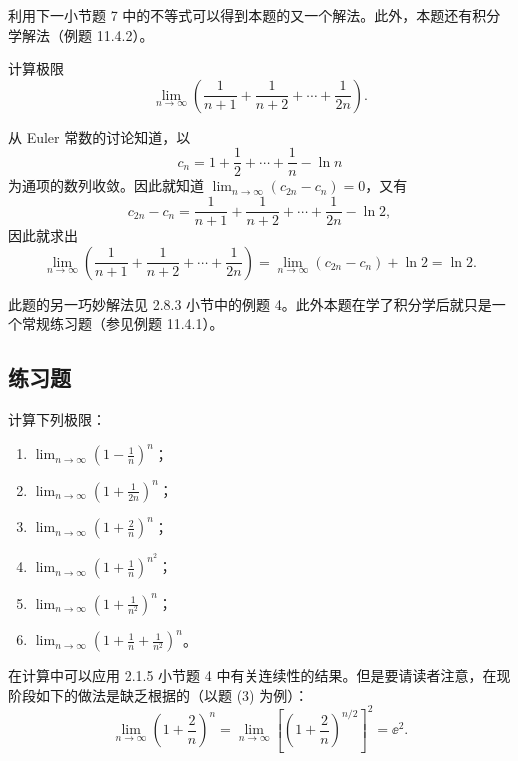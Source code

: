 \begin{xremark}
利用下一小节题 7 中的不等式可以得到本题的又一个解法。此外，本题还有积分学解法（例题 11.4.2）。
\end{xremark}

\begin{xexample}[2.5.4]
计算极限
\[
  \lim_{n\to\infty}\left(\frac1{n+1}+\frac1{n+2}+\cdots+\frac1{2n}\right).
\]
\end{xexample}
\begin{xsolution}
从 Euler 常数的讨论知道，以
\[
  c_n=1+\frac12+\cdots+\frac1n-\ln n
\]
为通项的数列收敛。因此就知道 $\displaystyle\lim_{n\to\infty}(c_{2n}-c_n)=0$，又有
\[
  c_{2n}-c_n=\frac1{n+1}+\frac1{n+2}+\cdots+\frac1{2n}-\ln2,
\]
因此就求出
\[
  \lim_{n\to\infty}\left(\frac1{n+1}+\frac1{n+2}+\cdots+\frac1{2n}\right)
  =\lim_{n\to\infty}(c_{2n}-c_n)+\ln2=\ln2.
\]
\end{xsolution}

\begin{xremark}
此题的另一巧妙解法见 2.8.3 小节中的例题 4。此外本题在学了积分学后就只是一个常规练习题（参见例题 11.4.1）。
\end{xremark}

\subsection{练习题}

\begin{xexercise}[1]
计算下列极限：
  \begin{enumerate}[label=(\arabic*)]
    \item $\displaystyle\lim_{n\to\infty}\left(1-\frac1n\right)^n$；
    \item $\displaystyle\lim_{n\to\infty}\left(1+\frac1{2n}\right)^n$；
    \item $\displaystyle\lim_{n\to\infty}\left(1+\frac2n\right)^n$；
    \item $\displaystyle\lim_{n\to\infty}\left(1+\frac1n\right)^{n^2}$；
    \item $\displaystyle\lim_{n\to\infty}\left(1+\frac1{n^2}\right)^n$；
    \item $\displaystyle\lim_{n\to\infty}\left(1+\frac1n+\frac1{n^2}\right)^n$。
  \end{enumerate}

  \begin{xremark}
  在计算中可以应用 2.1.5 小节题 4 中有关连续性的结果。但是要请读者注意，在现阶段如下的做法是缺乏根据的（以题 (3) 为例）：
  \[
    \lim_{n\to\infty}\left(1+\frac2n\right)^n
    =\lim_{n\to\infty}\left[\left(1+\frac2n\right)^{n/2}\right]^2
    =\ee^2.
  \]
  \end{xremark}
\end{xexercise}

